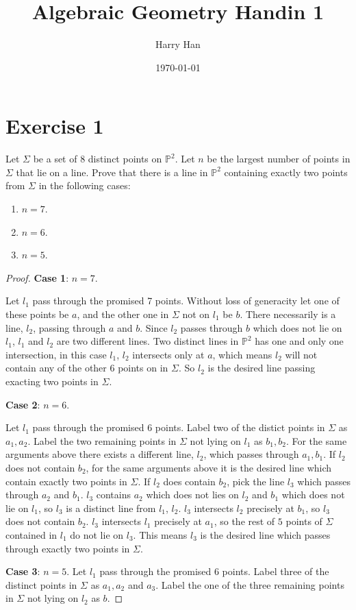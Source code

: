 \documentclass{article}
\title{Algebraic Geometry Handin 1}
\author{Harry Han}
\date{\today}
\theoremstyle{definition}
\theoremstyle{definition}
\theoremstyle{remark}
\newcommand{\bb}[1]{\mathbb{#1}} %
\begin{document}
\maketitle
\section*{Exercise 1}
Let \(\Sigma\) be a set of 8 distinct points on \(\mathbb{P}^2\). Let \(n\) be the largest number of points in \(\Sigma\) that lie on a line. Prove that there is a line in \(\mathbb{P}^2\) containing exactly two points from \(\Sigma\) in the following cases:
\begin{enumerate}
    \item \(n = 7\).
    \item \(n = 6\).
    \item \(n = 5\).
\end{enumerate}

\begin{proof}
	\textbf{Case 1}: $n = 7$.

	Let $l_1$ pass through the promised 7 points. 
	Without loss of generacity let one of these points be $a$, and the other one in $\Sigma$ not on $l_1$ be $b$. 
	There necessarily is a line, $l_2$, passing through $a$ and $b$. 
	Since $l_2$ passes through $b$ which does not lie on $l_1$, $l_1$ and $l_2$ are two different lines.
	Two distinct lines in $\bb{P}^2$ has one and only one intersection, in this case $l_1$, $l_2$ intersects only at $a$, which means $l_2$ will not contain any of the other 6 points on in $\Sigma$. 
	So $l_2$ is the desired line passing exacting two points in $\Sigma$.

	\textbf{Case 2}: $n = 6$.

	Let $l_1$ pass through the promised 6 points. 
	Label two of the distict points in $\Sigma$ as $a_1, a_2$. 
	Label the two remaining points in $\Sigma$ not lying on $l_1$ as $b_1, b_2$.
	For the same arguments above there exists a different line, $l_2$, which passes through $a_1, b_1$. 
	If $l_2$ does not contain $b_2$, for the same arguments above it is the desired line which contain exactly two points in $\Sigma$. 
	If $l_2$ does contain $b_2$, pick the line $l_3$ which passes through $a_2$ and $b_1$. 
	$l_3$ contains $a_2$ which does not lies on $l_2$ and $b_1$ which does not lie on $l_1$, so $l_3$ is a distinct line from $l_1$, $l_2$. 
	$l_3$ intersects $l_2$ precisely at $b_1$, so $l_3$ does not contain $b_2$. 
	$l_3$ intersects $l_1$ precisely at $a_1$, so the rest of $5$ points of $\Sigma$ contained in $l_1$ do not lie on $l_3$. 
	This means $l_3$ is the desired line which passes through exactly two points in $\Sigma$.

	\textbf{Case 3}: $n = 5$.
	Let $l_1$ pass through the promised 6 points. 
	Label three of the distinct points in $\Sigma$ as $a_1, a_2$ and $a_3$. 
	Label the one of the three remaining points in $\Sigma$ not lying on $l_2$ as $b$.


\end{proof}
\end{document}

